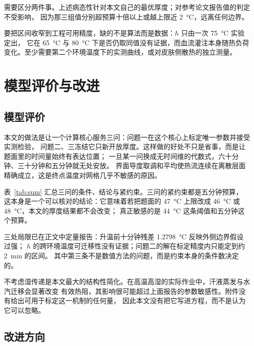 \documentclass[withoutpreface,bwprint]{cumcmthesis}
\begin{document}
需要区分两件事。上述病态性针对本文自己的最优厚度；对参考论文报告值的判定不受影响，
因为那三组值分别超预算十倍以上或越上限近 \SI{2}{\celsius}，远离任何边界。

要把区间收窄到工程可用精度，缺的不是算法而是数据：$h$ 只由一次 \SI{75}{\celsius} 实验定出，
它在 \SI{65}{\celsius} 与 \SI{80}{\celsius} 下是否仍取同值没有证据，而血流灌注本身随热负荷
变化。至少需要第二个环境温度下的实测曲线，或对皮肤侧散热的独立测量。

\section{模型评价与改进}

\subsection{模型评价}

本文的做法是让一个计算核心服务三问：问题一在这个核心上标定唯一参数并接受实测检验，
问题二、三冻结它只新开放厚度。这样做的好处不只是省事，而是让题面里的时间量始终有表达位置；
一旦某一问换成无时间维的代数式，六十分钟、三十分钟和五分钟就无处安放。
界面导度取调和平均使热流连续在离散层面精确成立，这是终点温度对网格几乎不敏感的原因。

表~\ref{tab:sum} 汇总三问的条件、结论与紧约束。三问的紧约束都是五分钟预算，
这本身是一个可以核对的结论：它意味着若把题面的 \SI{47}{\celsius} 上限改成
\SI{46}{\celsius} 或 \SI{48}{\celsius}，本文的厚度结果都不会改变；
真正敏感的是 \SI{44}{\celsius} 这条阈值和五分钟这个预算。

\begin{table}[htbp]
  \centering
  \caption{三问结论汇总}
  \label{tab:sum}
  
\end{table}

三处局限已在正文中定量报告：升温前十分钟残差 \SI{1.2798}{\celsius} 反映外侧边界假设过强；
$h$ 的跨环境温度可迁移性没有证据；问题二的解在标定精度内只能定到约 \SI{2}{mm} 的区间。
其中第三条不是数值方法的问题，而是约束本身的条件数决定的。

不考虑湿传递是本文最大的结构性简化。在高温高湿的实际作业中，汗液蒸发与水汽迁移会显著改变
有效热阻，其影响很可能超过上面报告的参数敏感性。附件没有给出可用于标定这一机制的任何量，
因此本文没有把它写进方程，而不是认为它可以忽略。

\subsection{改进方向}
\end{document}

